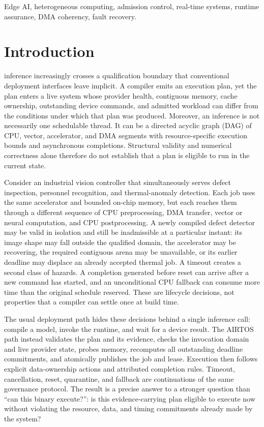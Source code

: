 \documentclass[lettersize,journal]{IEEEtran}
\begin{document}
\begin{IEEEkeywords}
Edge AI, heterogeneous computing, admission control, real-time systems,
runtime assurance, DMA coherency, fault recovery.
\end{IEEEkeywords}

\section{Introduction}
 inference increasingly crosses a qualification boundary
that conventional deployment interfaces leave implicit. A compiler emits an
execution plan, yet the plan enters a live system whose provider health,
contiguous memory, cache ownership, outstanding device commands, and admitted
workload can differ from the conditions under which that plan was produced.
Moreover, an inference is not necessarily one schedulable thread. It can be a
directed acyclic graph (DAG) of CPU, vector, accelerator, and DMA segments with
resource-specific execution bounds and asynchronous completions. Structural
validity and numerical correctness alone therefore do not establish that a
plan is eligible to run in the current state.

Consider an industrial vision controller that simultaneously serves defect
inspection, personnel recognition, and thermal-anomaly detection. Each job
uses the same accelerator and bounded on-chip memory, but each reaches them
through a different sequence of CPU preprocessing, DMA transfer, vector or
neural computation, and CPU postprocessing. A newly compiled defect detector
may be valid in isolation and still be inadmissible at a particular instant:
its image shape may fall outside the qualified domain, the accelerator may be
recovering, the required contiguous arena may be unavailable, or its earlier
deadline may displace an already accepted thermal job. A timeout creates a
second class of hazards. A completion generated before reset can arrive after
a new command has started, and an unconditional CPU fallback can consume more
time than the original schedule reserved. These are lifecycle decisions, not
properties that a compiler can settle once at build time.

The usual deployment path hides these decisions behind a single inference
call: compile a model, invoke the runtime, and wait for a device result. The
AIRTOS path instead validates the plan and its evidence, checks the invocation
domain and live provider state, probes memory, recomputes all outstanding
deadline commitments, and atomically publishes the job and lease. Execution
then follows explicit data-ownership actions and attributed completion rules.
Timeout, cancellation, reset, quarantine, and fallback are continuations of
the same governance protocol. The result is a precise answer to a stronger
question than ``can this binary execute?'': is this evidence-carrying plan
eligible to execute now without violating the resource, data, and timing
commitments already made by the system?
\end{document}
